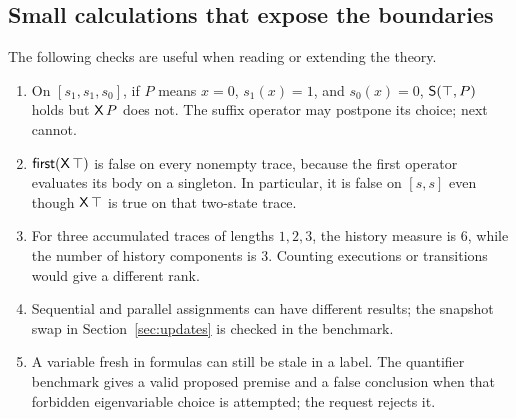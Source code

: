 \subsection{Small calculations that expose the boundaries}
The following checks are useful when reading or extending the theory.
\begin{enumerate}
\item On $[s_1,s_1,s_0]$, if $P$ means $x=0$, $s_1(x)=1$, and $s_0(x)=0$,
$\mathsf{S}(\top,P)$ holds but $\mathsf{X}\,P$ does not. The suffix operator may postpone
its choice; next cannot.
\item $\mathsf{first}(\mathsf{X}\,\top)$ is false on every nonempty trace, because the first
operator evaluates its body on a singleton. In particular, it is false on
$[s,s]$ even though $\mathsf{X}\,\top$ is true on that two-state trace.
\item For three accumulated traces of lengths $1,2,3$, the history measure
is $6$, while the number of history components is $3$. Counting executions
or transitions would give a different rank.
\item Sequential and parallel assignments can have different results; the
snapshot swap in Section~\ref{sec:updates} is checked in the benchmark.
\item A variable fresh in formulas can still be stale in a label. The
quantifier benchmark gives a valid proposed premise and a false conclusion
when that forbidden eigenvariable choice is attempted; the request rejects it.
\end{enumerate}

